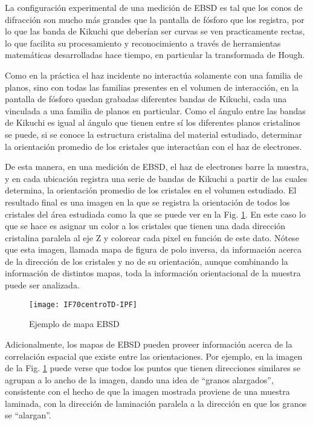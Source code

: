 La configuración experimental de una medición de EBSD es tal que los conos de difracción son mucho más grandes que la pantalla de fósforo que los registra, por lo que las banda de Kikuchi que deberían ser curvas se ven practicamente rectas, lo que facilita su procesamiento y reconocimiento a través de herramientas matemáticas desarrolladas hace tiempo, en particular la transformada de Hough\cite{wiki:Hough}.

Como en la práctica el haz incidente no interactúa solamente con una familia de planos, sino con todas las familias presentes en el volumen de interacción, en la pantalla de fósforo quedan grabadas diferentes bandas de Kikuchi, cada una vinculada a una familia de planos en particular.
Como el ángulo entre las bandas de Kikuchi es igual al ángulo que tienen entre sí los diferentes planos cristalinos\cite{schwartz2010electron} se puede, si se conoce la estructura cristalina del material estudiado, determinar la orientación promedio de los cristales que interactúan con el haz de electrones.

De esta manera, en una medición de EBSD, el haz de electrones barre la muestra, y en cada ubicación registra una serie de bandas de Kikuchi a partir de las cuales determina, la orientación promedio de los cristales en el volumen estudiado.
El resultado final es una imagen en la que se registra la orientación de todos los cristales del área estudiada como la que se puede ver en la Fig. \ref{fig:ebsdex}. 
En este caso lo que se hace es asignar un color a los cristales que tienen una dada dirección cristalina paralela al eje Z y colorear cada pixel en función de este dato. 
Nótese que esta imagen, llamada mapa de figura de polo inversa, da información acerca de la dirección de los cristales y no de su orientación, aunque combinando la información de distintos mapas, toda la información orientacional de la muestra puede ser analizada.
\begin{figure}[!htb]
  \centering
  \texttt{[image: IF70centroTD-IPF]}
  \caption{Ejemplo de mapa EBSD}
  \label{fig:ebsdex}
\end{figure}

Adicionalmente, los mapas de EBSD pueden proveer información acerca de la correlación espacial que existe entre las orientaciones. 
Por ejemplo, en la imagen de la Fig. \ref{fig:ebsdex} puede verse que todos los puntos que tienen direcciones similares se agrupan a lo ancho de la imagen, dando una idea de ``granos alargados'', consistente con el hecho de que la imagen mostrada proviene de una muestra laminada, con la dirección de laminación paralela a la dirección en que los granos se ``alargan''.

